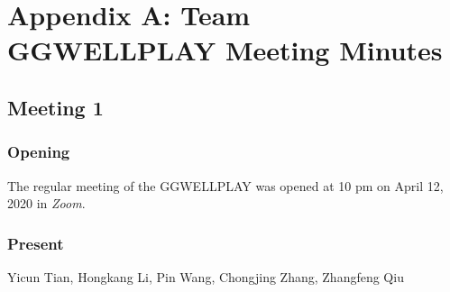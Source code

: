 \documentclass{report}
\begin{document}

\chapter*{Appendix A: Team GGWELLPLAY Meeting Minutes}
\section*{Meeting 1}
\subsection*{Opening}
The regular meeting of the GGWELLPLAY was opened at 10 pm on April 12, 2020 in \textit{Zoom}.

\subsection*{Present}
Yicun Tian, Hongkang Li, Pin Wang, Chongjing Zhang, Zhangfeng Qiu
\end{document}
